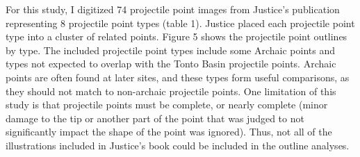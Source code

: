 \documentclass{article}
\begin{document}
For this study, I digitized 74 projectile point images from Justice's
publication representing 8 projectile point types (table 1). Justice
placed each projectile point type into a cluster of related points.
Figure 5 shows the projectile point outlines by type. The included
projectile point types include some Archaic points and types not
expected to overlap with the Tonto Basin projectile points. Archaic
points are often found at later sites, and these types form useful
comparisons, as they should not match to non-archaic projectile points.
One limitation of this study is that projectile points must be complete,
or nearly complete (minor damage to the tip or another part of the point
that was judged to not significantly impact the shape of the point was
ignored). Thus, not all of the illustrations included in Justice's book
could be included in the outline analyses.

 
  \providecommand{\huxb}[2]{\arrayrulecolor[RGB]{#1}\global\arrayrulewidth=#2pt}
  \providecommand{\huxvb}[2]{\color[RGB]{#1}\vrule width #2pt}
  \providecommand{\huxtpad}[1]{\rule{0pt}{#1}}
  \providecommand{\huxbpad}[1]{\rule[-#1]{0pt}{#1}}
\end{document}
